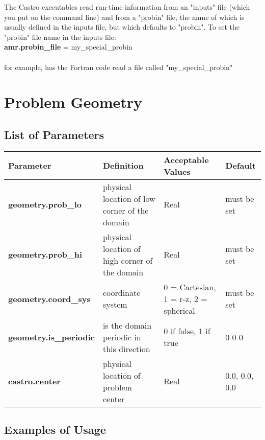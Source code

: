 The Castro executables read run-time information from an "inputs" file (which you put on the command line) 
and from a "probin" file, the name of which is usually defined in the inputs file, but which defaults to "probin".  
To set the "probin" file name in the inputs file:\\

{\bf amr.probin\_file} = my\_special\_probin\\ \\
for example, has the Fortran code read a file called "my\_special\_probin"

\section{Problem Geometry}

\subsection{List of Parameters}

\begin{table*}[h]
\begin{scriptsize}
\begin{tabular}{|l|l|l|l|} \hline
Parameter & Definition & Acceptable Values & Default \\
\hline
{\bf geometry.prob\_lo} & physical location of low corner of the domain & Real & must be set\\
{\bf geometry.prob\_hi} & physical location of high corner of the domain & Real  & must be set\\
{\bf geometry.coord\_sys} & coordinate system & 0 = Cartesian, 1 = r-z, 2 = spherical & must be set \\
{\bf geometry.is\_periodic} & is the domain periodic in this direction & 0 if false, 1 if true  & 0 0 0 \\
{\bf castro.center} & physical location of problem center & Real & 0.0, 0.0, 0.0 \\
\hline
\end{tabular}
\label{Table:Geometry}
\end{scriptsize}
\end{table*}

\subsection{Examples of Usage}

